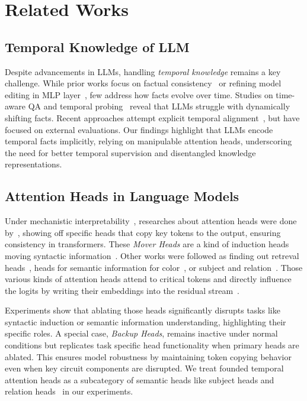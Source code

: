 \section{Related Works}
\label{sec:related-works}

\subsection{Temporal Knowledge of LLM}  
Despite advancements in LLMs, handling \emph{temporal knowledge} remains a key challenge. 
While prior works focus on factual consistency~\citep{lama, negated} or refining model editing in MLP layer~\citep{mend, rome, memit}, few address how facts evolve over time. 
Studies on time-aware QA and temporal probing~\citep{timeqa, zhang2021situatedqa, dhingra-etal-2022-time, temporalwiki} reveal that LLMs struggle with dynamically shifting facts.
Recent approaches attempt explicit temporal alignment~\citep{carpediem, settheclock, dyknow, chroknowledge}, but have focused on external evaluations.
Our findings highlight that LLMs encode temporal facts implicitly, relying on manipulable attention heads, underscoring the need for better temporal supervision and disentangled knowledge representations.

\subsection{Attention Heads in Language Models}
\label{subsubsec:attention-heads}
Under mechanistic interpretability~\cite{zoom, causal, open}, researches about attention heads were done by~\citealp{syntactichead, ioi, copysuppression}, showing off specific heads that copy key tokens to the output, ensuring consistency in transformers.
These \textit{Mover Heads} are a kind of induction heads~\citep{inductionhead} moving syntactic information~\citep{subwordmergehead}.
Other works were followed as finding out retreval heads~\citep{rethead}, heads for semantic information for color~\citep{circuitcolor}, or subject and relation~\citep{subhead}.
Those various kinds of attention heads attend to critical tokens and directly influence the logits by writing their embeddings into the residual stream~\citep{headsurvey}.

Experiments show that ablating those heads significantly disrupts tasks like syntactic induction or semantic information understanding, highlighting their specific roles.
A special case, \emph{Backup Heads}, remains inactive under normal conditions but replicates task specific head functionality when primary heads are ablated. 
This ensures model robustness by maintaining token copying behavior even when key circuit components are disrupted.
We treat founded temporal attention heads as a subcategory of semantic heads like subject heads and relation heads~\citep{subhead} in our experiments.
